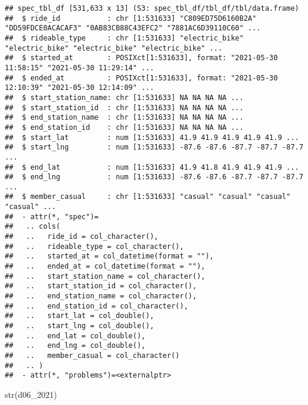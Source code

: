 \documentclass[
]{article}
\newenvironment{Shaded}{\begin{snugshade}}{\end{snugshade}}
\newcommand{\FunctionTok}[1]{\textcolor[rgb]{0.00,0.00,0.00}{#1}}
\newcommand{\NormalTok}[1]{#1}
\begin{document}
\begin{verbatim}
## spec_tbl_df [531,633 x 13] (S3: spec_tbl_df/tbl_df/tbl/data.frame)
##  $ ride_id           : chr [1:531633] "C809ED75D6160B2A" "DD59FDCE0ACACAF3" "0AB83CB88C43EFC2" "7881AC6D39110C60" ...
##  $ rideable_type     : chr [1:531633] "electric_bike" "electric_bike" "electric_bike" "electric_bike" ...
##  $ started_at        : POSIXct[1:531633], format: "2021-05-30 11:58:15" "2021-05-30 11:29:14" ...
##  $ ended_at          : POSIXct[1:531633], format: "2021-05-30 12:10:39" "2021-05-30 12:14:09" ...
##  $ start_station_name: chr [1:531633] NA NA NA NA ...
##  $ start_station_id  : chr [1:531633] NA NA NA NA ...
##  $ end_station_name  : chr [1:531633] NA NA NA NA ...
##  $ end_station_id    : chr [1:531633] NA NA NA NA ...
##  $ start_lat         : num [1:531633] 41.9 41.9 41.9 41.9 41.9 ...
##  $ start_lng         : num [1:531633] -87.6 -87.6 -87.7 -87.7 -87.7 ...
##  $ end_lat           : num [1:531633] 41.9 41.8 41.9 41.9 41.9 ...
##  $ end_lng           : num [1:531633] -87.6 -87.6 -87.7 -87.7 -87.7 ...
##  $ member_casual     : chr [1:531633] "casual" "casual" "casual" "casual" ...
##  - attr(*, "spec")=
##   .. cols(
##   ..   ride_id = col_character(),
##   ..   rideable_type = col_character(),
##   ..   started_at = col_datetime(format = ""),
##   ..   ended_at = col_datetime(format = ""),
##   ..   start_station_name = col_character(),
##   ..   start_station_id = col_character(),
##   ..   end_station_name = col_character(),
##   ..   end_station_id = col_character(),
##   ..   start_lat = col_double(),
##   ..   start_lng = col_double(),
##   ..   end_lat = col_double(),
##   ..   end_lng = col_double(),
##   ..   member_casual = col_character()
##   .. )
##  - attr(*, "problems")=<externalptr>
\end{verbatim}

\begin{Shaded}
\begin{Highlighting}[]
\FunctionTok{str}\NormalTok{(d06\_2021)}
\end{Highlighting}
\end{Shaded}
\end{document}
